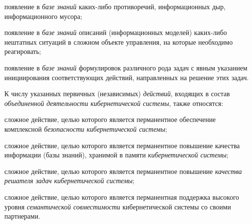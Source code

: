 \begin{SCn}
\begin{scnsubstruct}
{            \begin{scnitemize}
                \item появление в \textit{базе знаний} каких-либо противоречий, информационных дыр, информационного мусора;
                \item появление в \textit{базе знаний} описаний (информационных моделей) каких-либо нештатных ситуаций в сложном объекте управления, на которые необходимо реагировать;
                \item появление в \textit{базе знаний} формулировок различного рода задач с явным указанием инициирования соответствующих действий, направленных на решение этих задач.
            \end{scnitemize}
            К числу указанных первичных (независимых) \textit{действий}, входящих в состав \textit{объединенной деятельности кибернетической системы}, также относятся:
            \begin{scnitemize}
                \item сложное действие, целью которого является перманентное обеспечение комплексной \textit{безопасности кибернетической системы};
                \item сложное действие, целью которого является перманентное повышение качества информации (базы знаний), хранимой в памяти \textit{кибернетической системы};
                \item сложное действие, целью которого является перманентное повышение \textit{качества решателя задач кибернетической системы};
                \item сложное действие, целью которого является перманентная поддержка высокого уровня \textit{семантической совместимости} кибернетической системы со своими партнерами.
            \end{scnitemize}}
        

\end{scnsubstruct}
\end{SCn}
